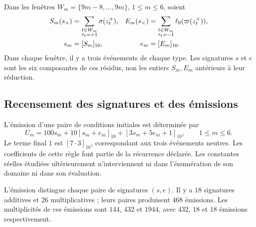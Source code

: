 Dans les fenêtres $W_m=\{9m-8,\ldots,9m\}$, $1\le m\le6$, soient
\begin{align}
 S_m(s_+)&=\sum_{\substack{t\in W_m\\\tau_t=+1}}
                 \sigma(z_t^+),&
 E_m(s_\times)&=\sum_{\substack{t\in W_m\\\tau_t=-1}}
                 \ell_9(\varpi(z_t^\times)),
 \label{iii:nf-firmas}\\
 s_m&=[S_m]_{10},&e_m&=[E_m]_{10}.\notag
\end{align}
Dans chaque fenêtre, il y a trois événements de chaque type. Les signatures $s$ et $e$
sont les six composantes de ces résidus, non les entiers $S_m,E_m$
antérieurs à leur réduction.

\subsection{Recensement des signatures et des émissions}

L’émission d’une paire de conditions initiales est déterminée par
\begin{equation}
 U_m=100s_m+10[s_m+e_m]_{10}+[3s_m+5e_m+1]_{10},
 \qquad 1\le m\le6.
 \label{iii:nf-emision}
\end{equation}
Le terme final $1$ est $[7\cdot3]_{10}$, correspondant aux trois
événements neutres. Les coefficients de cette règle font partie de la
récurrence déclarée. Les constantes réelles étudiées ultérieurement
n’interviennent ni dans l’énumération de son domaine ni dans son évaluation.

\begin{proposition}
\label{iii:nf-inyectividad}
L’émission distingue chaque paire de signatures $(s,e)$. Il y a $18$ signatures
additives et $26$ multiplicatives ; leurs paires produisent $468$ émissions.
Les multiplicités de ces émissions sont $144$, $432$ et $1944$,
avec $432$, $18$ et $18$ émissions respectivement.
\end{proposition}

